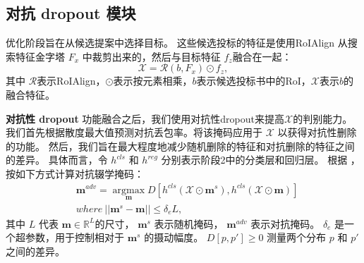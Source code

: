 \subsection{对抗 dropout 模块}
\label{sec:stage2}
优化阶段旨在从候选提案中选择目标。
这些候选投标的特征是使用RoIAlign \cite{he2017mask} 从搜索特征金字塔 $F_{x}$ 中裁剪出来的，然后与目标特征 $f_{z}$融合在一起：
\begin{equation}
    \mathcal{X} = \mathcal{R}(b, F_{x}) \odot f_{z},
\end{equation}
其中 $\mathcal{R}$表示RoIAlign，$\odot$表示按元素相乘，$b$表示候选投标书中的RoI，$\mathcal{X}$表示$b$的融合特征。

\textbf{对抗性 dropout} 功能融合之后，我们使用对抗性dropout\cite{park2018adversarial, lee2019drop}来提高$\mathcal{X}$的判别能力。
我们首先根据散度最大值预测对抗丢包率。将该掩码应用于 $\mathcal{X}$ 以获得对抗性删除的功能。
然后，我们旨在最大程度地减少随机删除的特征和对抗删除的特征之间的差异。
具体而言，令 $h^{cls}$ 和 $h^{reg}$ 分别表示阶段2中的分类层和回归层。
根据 \cite{lee2019drop}，按如下方式计算对抗辍学掩码：
\begin{equation}
\begin{split}
    & \mathbf{m}^{adv} = \mathop{\arg\max}\limits_{\mathbf{m}}D[h^{cls}(\mathcal{X} \odot \mathbf{m}^s), h^{cls}(\mathcal{X} \odot \mathbf{m})] \\
    & where~||\mathbf{m}^s - \mathbf{m}|| \leq \delta_e L,
\end{split}
\end{equation}
其中 $L$ 代表 $\mathbf{m} \in \mathbb R^L$的尺寸，
$\mathbf{m}^s$ 表示随机掩码， $\mathbf{m}^{adv}$ 表示对抗掩码。
$\delta_{e}$ 是一个超参数，用于控制相对于 $\mathbf{m}^{s}$ \cite{lee2019drop}的摄动幅度。
$D[p, p']  \geq 0$ 测量两个分布 $p$ 和 $p'$之间的差异。

